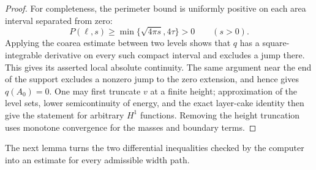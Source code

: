 \begin{proof}
For completeness, the perimeter bound is uniformly positive on each area interval separated from zero:
\[
 P(\ell,s)\ge\min\{\sqrt{4\pi s},4\tau\}>0\qquad(s>0).
\]
Applying the coarea estimate between two levels shows that $q$ has a square-integrable derivative on every such compact interval and excludes a jump there. This gives its asserted local absolute continuity. The same argument near the end of the support excludes a nonzero jump to the zero extension, and hence gives $q(A_0)=0$. One may first truncate $v$ at a finite height; approximation of the level sets, lower semicontinuity of energy, and the exact layer-cake identity then give the statement for arbitrary $H^1$ functions. Removing the height truncation uses monotone convergence for the masses and boundary terms.
\end{proof}

The next lemma turns the two differential inequalities checked by the computer into an estimate for every admissible width path.

